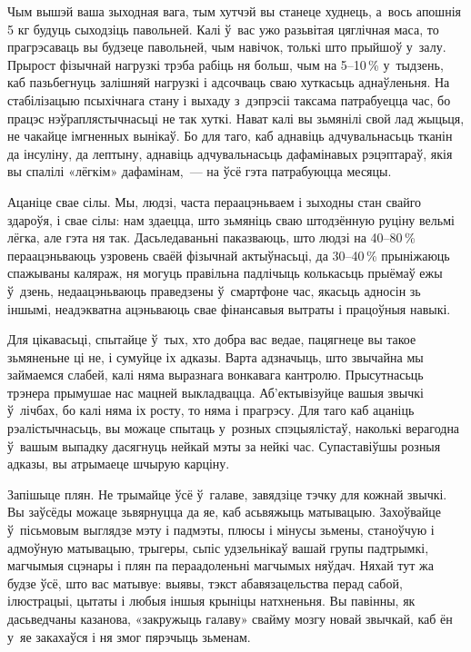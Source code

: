 Чым вышэй ваша зыходная вага, тым хутчэй вы станеце худнець, а~вось апошнія 5 кг будуць сыходзіць павольней. Калі ў~вас ужо разьвітая цяглічная маса, то прагрэсаваць вы будзеце павольней, чым навічок, толькі што прыйшоў у~залу. Прырост фізычнай нагрузкі трэба рабіць ня больш, чым на 5--10\,\% у~тыдзень, каб пазьбегнуць залішняй нагрузкі і адсочваць сваю хуткасьць аднаўленьня. На стабілізацыю псыхічнага стану і выхаду з~дэпрэсіі таксама патрабуецца час, бо працэс нэўраплястычнасьці не так хуткі. Нават калі вы зьмянілі свой лад жыцьця, не чакайце імгненных вынікаў. Бо для таго, каб аднавіць адчувальнасьць тканін да інсуліну, да лептыну, аднавіць адчувальнасьць дафамінавых рэцэптараў, якія вы спалілі «лёгкім» дафамінам,~--- на ўсё гэта патрабуюцца месяцы.

Ацаніце свае сілы. Мы, людзі, часта пераацэньваем і зыходны стан свайго здароўя, і свае сілы: нам здаецца, што зьмяніць сваю штодзённую руціну вельмі лёгка, але гэта ня так. Дасьледаваньні паказваюць, што людзі на 40--80\,\% пераацэньваюць узровень сваёй фізычнай актыўнасьці, да 30--40\,\% прыніжаюць спажываны каляраж, ня могуць правільна падлічыць колькасьць прыёмаў ежы ў~дзень, недаацэньваюць праведзены ў~смартфоне час, якасьць адносін зь іншымі, неадэкватна ацэньваюць свае фінансавыя вытраты і працоўныя навыкі.

Для цікавасьці, спытайце ў~тых, хто добра вас ведае, пацягнеце вы такое зьмяненьне ці не, і сумуйце іх адказы. Варта адзначыць, што звычайна мы займаемся слабей, калі няма выразнага вонкавага кантролю. Прысутнасьць трэнера прымушае нас мацней выкладвацца. Аб'ектывізуйце вашыя звычкі ў~лічбах, бо калі няма іх росту, то няма і прагрэсу. Для таго каб ацаніць рэалістычнасьць, вы можаце спытаць у~розных спэцыялістаў, наколькі верагодна ў~вашым выпадку дасягнуць нейкай мэты за нейкі час. Супаставіўшы розныя адказы, вы атрымаеце шчырую карціну.

Запішыце плян. Не трымайце ўсё ў~галаве, завядзіце тэчку для кожнай звычкі. Вы заўсёды можаце зьвярнуцца да яе, каб асьвяжыць матывацыю. Захоўвайце ў~пісьмовым выглядзе мэту і падмэты, плюсы і мінусы зьмены, станоўчую і адмоўную матывацыю, трыгеры, сьпіс удзельнікаў вашай групы падтрымкі, магчымыя сцэнары і плян па пераадоленьні магчымых няўдач. Няхай тут жа будзе ўсё, што вас матывуе: выявы, тэкст абавязацельства перад сабой, ілюстрацыі, цытаты і любыя іншыя крыніцы натхненьня. Вы павінны, як дасьведчаны казанова, «закружыць галаву» свайму мозгу новай звычкай, каб ён у~яе закахаўся і ня змог пярэчыць зьменам.

